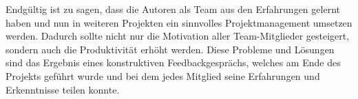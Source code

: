 
Endgültig ist zu sagen, dass die Autoren als Team aus den Erfahrungen gelernt haben und nun in weiteren Projekten ein sinnvolles Projektmanagement umsetzen werden.
Dadurch sollte nicht nur die Motivation aller Team-Mitglieder gesteigert, sondern auch die Produktivität erhöht werden.
Diese Probleme und Lösungen sind das Ergebnis eines konstruktiven Feedbackgesprächs, welches am Ende des Projekts geführt wurde und bei dem jedes Mitglied seine Erfahrungen und Erkenntnisse teilen konnte.
